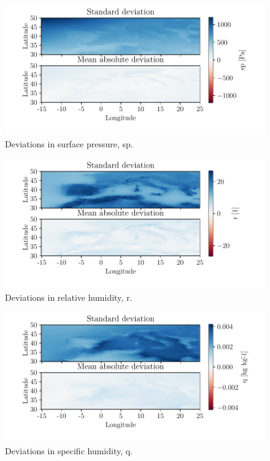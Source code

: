 \begin{figure}
    \centering
    \includegraphics{python_figs/DEVIATION_all_stat_variable_sp.pdf}
    \caption{Deviations in surface pressure, sp.}
    \label{fig:deviation_sp}
\end{figure}

\begin{figure}
    \centering
    \includegraphics{python_figs/DEVIATION_all_stat_variable_r.pdf}
    \caption{Deviations in relative humidity, r.}
    \label{fig:deviation_r}
\end{figure}


\begin{figure}
    \centering
    \includegraphics{python_figs/DEVIATION_all_stat_variable_q.pdf}
    \caption{Deviations in specific humidity, q.}
    \label{fig:deviation_q}
\end{figure}



